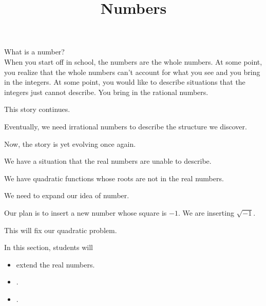\documentclass{ximera}
\title{Numbers}
\begin{document}
\begin{abstract}
\end{abstract}
\maketitle







What is a number? \\


When you start off in school, the numbers are the whole numbers.  At some point, you realize that the whole numbers can't account for what you see and you bring in the integers.  At some point, you would like to describe situations that the integers just cannot describe.  You bring in the rational numbers. 


This story continues.

Eventually, we need irrational numbers to describe the structure we discover.


Now, the story is yet evolving once again.


\begin{explanation}

We have a situation that the real numbers are unable to describe.


We have quadratic functions whose roots are not in the real numbers.  


We need to expand our idea of number.

\end{explanation}



Our plan is to insert a new number whose square is $-1$.  We are inserting $\sqrt{-1}$.  


This will fix our quadratic problem.










\begin{sectionOutcomes}
In this section, students will 

\begin{itemize}
\item extend the real numbers.
\item .
\item .
\end{itemize}
\end{sectionOutcomes}
\end{document}

